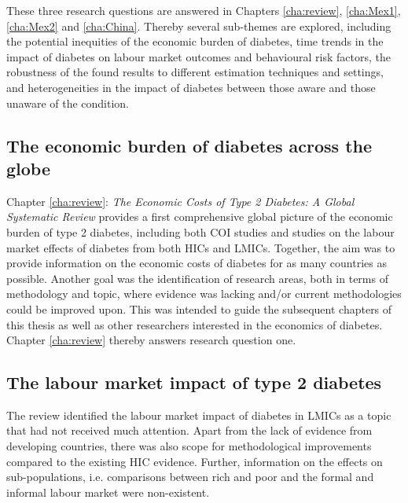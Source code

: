 These three research questions are answered in Chapters \ref{cha:review}, \ref{cha:Mex1}, \ref{cha:Mex2} and \ref{cha:China}. Thereby several sub-themes are explored, including the potential inequities of the economic burden of diabetes, time trends in the impact of diabetes on labour market outcomes and behavioural risk factors, the robustness of the found results to different estimation techniques and settings, and heterogeneities in the impact of diabetes between those aware and those unaware of the condition.


\subsection{The economic burden of diabetes across the globe}

Chapter \ref{cha:review}: \textit{The Economic Costs of Type 2 Diabetes: A Global Systematic Review} provides a first comprehensive global picture of the economic burden of type 2 diabetes, including both \ac{COI} studies and studies on the labour market effects of diabetes from both \acp{HIC} and \acp{LMIC}. Together, the aim was to provide information on the economic costs of diabetes for as many countries as possible. Another goal was the identification of research areas, both in terms of methodology and topic, where evidence was lacking and/or current methodologies could be improved upon. This was intended to guide the subsequent chapters of this thesis as well as other researchers interested in the economics of diabetes. Chapter \ref{cha:review} thereby answers research question one.

\subsection{The labour market impact of type 2 diabetes}

The review identified the labour market impact of diabetes in \acp{LMIC} as a topic that had not received much attention. Apart from the lack of evidence from developing countries, there was also scope for methodological improvements compared to the existing \ac{HIC} evidence. Further, information on the effects on sub-populations, i.e. comparisons between rich and poor and the formal and informal labour market were non-existent.


